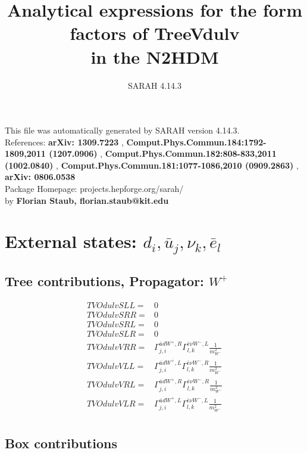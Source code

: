 \documentclass[A4,landscape]{article}
\begin{document}
\title{Analytical expressions for the form factors of TreeVdulv\\ in the N2HDM } 
 \author{SARAH 4.14.3} 
 \maketitle 
 \vspace{10cm} 
This file was automatically generated by SARAH version 4.14.3.  \\ 
References: {\bf arXiv: 1309.7223 }, {\bf Comput.Phys.Commun.184:1792-1809,2011 (1207.0906) }, {\bf Comput.Phys.Commun.182:808-833,2011 (1002.0840) }, {\bf Comput.Phys.Commun.181:1077-1086,2010 (0909.2863) }, {\bf arXiv: 0806.0538 } \\ 
Package Homepage: projects.hepforge.org/sarah/ \\ 
by {\bf Florian Staub, florian.staub@kit.edu} 
 \pagebreak 
 \tableofcontents 
 \pagebreak 
\section{External states: ${d_{{i}}, \bar{u}_{{j}}, \nu_{{k}}, \bar{e}_{{l}}}$} 
\subsection{Tree contributions, Propagator: $W^+$} 

\begin{align} 
  TVOdulvSLL= & 0 \\ 
  TVOdulvSRR= & 0 \\ 
  TVOdulvSRL= & 0 \\ 
  TVOdulvSLR= & 0 \\ 
  TVOdulvVRR= & \Gamma^{\bar{u}d W^+,R}_{j, i} \Gamma^{\bar{e}\nu W^- ,L}_{l, k} \frac{1}{m^2_{W^-}} \\ 
  TVOdulvVLL= & \Gamma^{\bar{u}d W^+,L}_{j, i} \Gamma^{\bar{e}\nu W^- ,R}_{l, k} \frac{1}{m^2_{W^-}} \\ 
  TVOdulvVRL= & \Gamma^{\bar{u}d W^+,R}_{j, i} \Gamma^{\bar{e}\nu W^- ,R}_{l, k} \frac{1}{m^2_{W^-}} \\ 
  TVOdulvVLR= & \Gamma^{\bar{u}d W^+,L}_{j, i} \Gamma^{\bar{e}\nu W^- ,L}_{l, k} \frac{1}{m^2_{W^-}} \\ 
\end{align} 
\subsection{Box contributions} 
\end{document}
